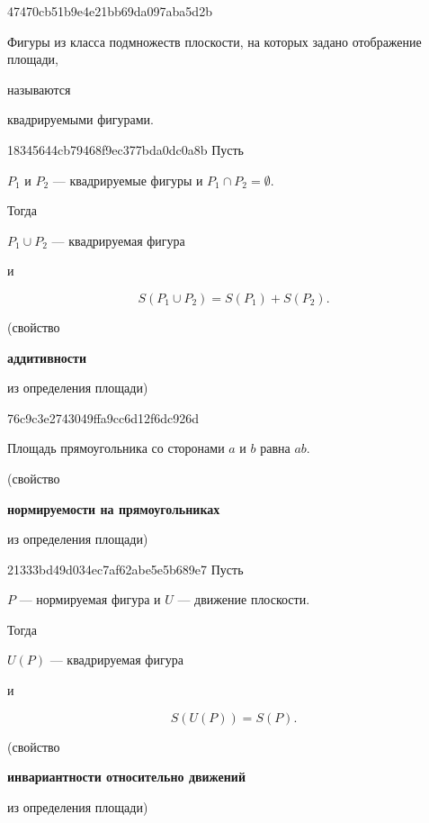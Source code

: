 \begin{note}{47470cb51b9e4e21bb69da097aba5d2b}
    \begin{icloze}{2}Фигуры из класса подмножеств плоскости, на которых задано отображение площади,\end{icloze} называются \begin{icloze}{1}квадрируемыми фигурами.\end{icloze}
\end{note}

\begin{note}{18345644cb79468f9ec377bda0dc0a8b}
    Пусть \begin{icloze}{3}\({ P_1 }\) и \({ P_2 }\) --- квадрируемые фигуры и \({ P_1 \cap P_2 = \emptyset }\).\end{icloze}
    Тогда \begin{icloze}{1}\({ P_1 \cup P_2 }\) --- квадрируемая фигура\end{icloze} и
    \begin{icloze}{2}
        \[
            S(P_1 \cup P_2) = S(P_1) + S(P_2).
        \]
    \end{icloze}

    \begin{center}
        \tiny
        (свойство \begin{icloze}{4}\textbf{аддитивности}\end{icloze} из определения площади)
    \end{center}
\end{note}

\begin{note}{76c9c3e2743049ffa9cc6d12f6dc926d}
    \begin{icloze}{1}Площадь прямоугольника со сторонами \({ a }\) и \({ b }\) равна \({ a b }\).\end{icloze}

    \begin{center}
        \tiny
        (свойство \begin{icloze}{2}\textbf{нормируемости на прямоугольниках}\end{icloze} из определения площади)
    \end{center}
\end{note}

\begin{note}{21333bd49d034ec7af62abe5e5b689e7}
    Пусть \begin{icloze}{3}\({ P }\) --- нормируемая фигура и \({ U }\) --- движение плоскости.\end{icloze}
    Тогда \begin{icloze}{1}\({ U(P) }\) --- квадрируемая фигура\end{icloze} и
    \begin{icloze}{2}
        \[
            S(U(P)) = S(P).
        \]
    \end{icloze}

    \begin{center}
        \tiny
        (свойство \begin{icloze}{4}\textbf{инвариантности относительно движений}\end{icloze} из определения площади)
    \end{center}
\end{note}

